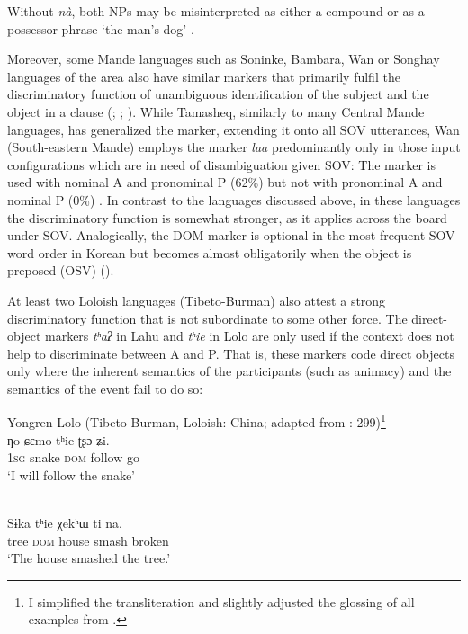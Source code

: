 \documentclass[output=paper]{langsci/langscibook}
\begin{document}
Without \textit{nà}, both NPs may be misinterpreted as either a compound or as a possessor phrase ‘the man’s dog’ \citep[91]{Heath2007}.

Moreover, some Mande languages such as Soninke, Bambara, Wan or Songhay languages of the area also have similar markers that primarily fulfil the discriminatory function of unambiguous identification of the subject and the object in a clause (\citealt{Heath2007}; \citealt{CreisselsDiagne2013}; \citealt{Nikitina2018}). While Tamasheq, similarly to many Central Mande languages, has generalized the marker, extending it onto all SOV utterances, Wan (South-eastern Mande) employs the marker \textit{laa} predominantly only in those input configurations which are in need of disambiguation given SOV: The marker is used with nominal A and pronominal P (62\%) but not with pronominal A and nominal P (0\%) \citep[202]{Nikitina2018}. In contrast to the languages discussed above, in these languages the discriminatory function is somewhat stronger, as it applies across the board under SOV. Analogically, the DOM marker is optional in the most frequent SOV word order in Korean but becomes almost obligatorily when the object is preposed (OSV) (\citealt{AhnCho2007}).

At least two Loloish languages (Tibeto-Burman) also attest a strong discriminatory function that is not subordinate to some other force. The direct-object markers \textit{tʰ}\textit{aʔ} in Lahu and \textit{tʰ}\textit{ie} in Lolo are only used if the context does not help to discriminate between A and P. That is, these markers code direct objects only where the inherent semantics of the participants (such as animacy) and the semantics of the event fail to do so:

\ea\label{ex:serzant:25}
Yongren Lolo (Tibeto-Burman, Loloish: China; adapted from \citealt{Gerner2008}: 299)\footnote{I simplified the transliteration and slightly adjusted the glossing of all examples from \citet{Gerner2008}.}\\
\gll ƞo   ɕεmo   tʰie   ʈʂɔ   ʑi.\\
     1\textsc{sg}  snake  \textsc{dom}  follow  go\\
\glt ‘I will follow the snake’
\z

\ea\label{ex:serzant:}
\\
\gll Sɨka   tʰie   χekʰɯ   ti   na.\\
     tree  \textsc{dom}  house  smash  broken\\
\glt ‘The house smashed the tree.’
\z
\end{document}
